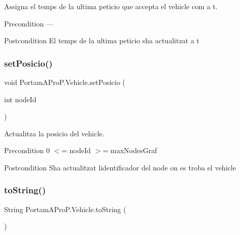 Assigna el temps de la ultima peticio que accepta el vehicle com a t. 

\begin{DoxyPrecond}{Precondition}
--- 
\end{DoxyPrecond}
\begin{DoxyPostcond}{Postcondition}
El temps de la ultima peticio s\textquotesingle{}ha actualitzat a t 
\end{DoxyPostcond}
\mbox{\label{class_portam_a_pro_p_1_1_vehicle_a36c3f9cd157876333245102034f297e3}} 
\subsubsection{\texorpdfstring{set\+Posicio()}{setPosicio()}}
{\footnotesize\ttfamily void Portam\+A\+Pro\+P.\+Vehicle.\+set\+Posicio (\begin{DoxyParamCaption}\item[{int}]{node\+Id }\end{DoxyParamCaption})}



Actualitza la posicio del vehicle. 

\begin{DoxyPrecond}{Precondition}
0 $<$= node\+Id $>$= max\+Nodes\+Graf 
\end{DoxyPrecond}
\begin{DoxyPostcond}{Postcondition}
S\textquotesingle{}ha actualitzat l\textquotesingle{}identificador del node on es troba el vehicle 
\end{DoxyPostcond}
\mbox{\label{class_portam_a_pro_p_1_1_vehicle_a54c396472460bc914c2cc65b64ab5a0b}} 
\subsubsection{\texorpdfstring{to\+String()}{toString()}}
{\footnotesize\ttfamily String Portam\+A\+Pro\+P.\+Vehicle.\+to\+String (\begin{DoxyParamCaption}{ }\end{DoxyParamCaption})}



